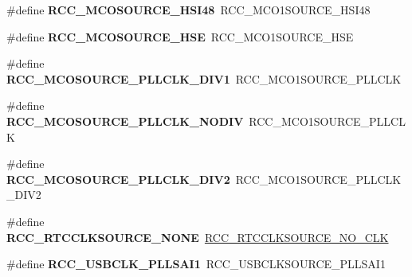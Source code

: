 \begin{DoxyCompactItemize}
\item 
\hypertarget{group___h_a_l___r_c_c___aliased_ga31f756beeaf0bcc8082ec46ff42cfb2c}{\#define {\bfseries R\-C\-C\-\_\-\-M\-C\-O\-S\-O\-U\-R\-C\-E\-\_\-\-H\-S\-I48}~R\-C\-C\-\_\-\-M\-C\-O1\-S\-O\-U\-R\-C\-E\-\_\-\-H\-S\-I48}\label{group___h_a_l___r_c_c___aliased_ga31f756beeaf0bcc8082ec46ff42cfb2c}

\item 
\hypertarget{group___h_a_l___r_c_c___aliased_ga4e6a5a2c5b38b11470c34f9adc4adb5a}{\#define {\bfseries R\-C\-C\-\_\-\-M\-C\-O\-S\-O\-U\-R\-C\-E\-\_\-\-H\-S\-E}~R\-C\-C\-\_\-\-M\-C\-O1\-S\-O\-U\-R\-C\-E\-\_\-\-H\-S\-E}\label{group___h_a_l___r_c_c___aliased_ga4e6a5a2c5b38b11470c34f9adc4adb5a}

\item 
\hypertarget{group___h_a_l___r_c_c___aliased_ga962bbca249325c15747b0b49c47a378c}{\#define {\bfseries R\-C\-C\-\_\-\-M\-C\-O\-S\-O\-U\-R\-C\-E\-\_\-\-P\-L\-L\-C\-L\-K\-\_\-\-D\-I\-V1}~R\-C\-C\-\_\-\-M\-C\-O1\-S\-O\-U\-R\-C\-E\-\_\-\-P\-L\-L\-C\-L\-K}\label{group___h_a_l___r_c_c___aliased_ga962bbca249325c15747b0b49c47a378c}

\item 
\hypertarget{group___h_a_l___r_c_c___aliased_ga8f2e0c2303a5c5c53a64a60f6900b09e}{\#define {\bfseries R\-C\-C\-\_\-\-M\-C\-O\-S\-O\-U\-R\-C\-E\-\_\-\-P\-L\-L\-C\-L\-K\-\_\-\-N\-O\-D\-I\-V}~R\-C\-C\-\_\-\-M\-C\-O1\-S\-O\-U\-R\-C\-E\-\_\-\-P\-L\-L\-C\-L\-K}\label{group___h_a_l___r_c_c___aliased_ga8f2e0c2303a5c5c53a64a60f6900b09e}

\item 
\hypertarget{group___h_a_l___r_c_c___aliased_ga0c689edb9d017b7498258d5e9a9cf5f6}{\#define {\bfseries R\-C\-C\-\_\-\-M\-C\-O\-S\-O\-U\-R\-C\-E\-\_\-\-P\-L\-L\-C\-L\-K\-\_\-\-D\-I\-V2}~R\-C\-C\-\_\-\-M\-C\-O1\-S\-O\-U\-R\-C\-E\-\_\-\-P\-L\-L\-C\-L\-K\-\_\-\-D\-I\-V2}\label{group___h_a_l___r_c_c___aliased_ga0c689edb9d017b7498258d5e9a9cf5f6}

\item 
\hypertarget{group___h_a_l___r_c_c___aliased_ga7ac4762e5f4ebe4a04aea58edc9c46a9}{\#define {\bfseries R\-C\-C\-\_\-\-R\-T\-C\-C\-L\-K\-S\-O\-U\-R\-C\-E\-\_\-\-N\-O\-N\-E}~\hyperlink{group___r_c_c___r_t_c___l_c_d___clock___source_gacce0b2f54d103340d8c3a218e86e295d}{R\-C\-C\-\_\-\-R\-T\-C\-C\-L\-K\-S\-O\-U\-R\-C\-E\-\_\-\-N\-O\-\_\-\-C\-L\-K}}\label{group___h_a_l___r_c_c___aliased_ga7ac4762e5f4ebe4a04aea58edc9c46a9}

\item 
\hypertarget{group___h_a_l___r_c_c___aliased_gad3aae66d6569b04d04517ea523ce6e9e}{\#define {\bfseries R\-C\-C\-\_\-\-U\-S\-B\-C\-L\-K\-\_\-\-P\-L\-L\-S\-A\-I1}~R\-C\-C\-\_\-\-U\-S\-B\-C\-L\-K\-S\-O\-U\-R\-C\-E\-\_\-\-P\-L\-L\-S\-A\-I1}\label{group___h_a_l___r_c_c___aliased_gad3aae66d6569b04d04517ea523ce6e9e}


\end{DoxyCompactItemize}
